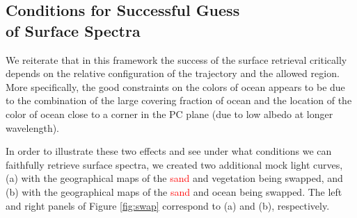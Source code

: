 \documentclass[iop,numberedappendix,apj]{emulateapj}
\def\edit#1{\textcolor{red}{#1}}
\begin{document}
\subsection{Conditions for Successful Guess\\of Surface Spectra}
\label{ss:guess}


We reiterate that in this framework the success of the surface retrieval critically depends on the relative configuration of the trajectory and the allowed region. 
More specifically, the good constraints on the colors of ocean appears to be due to the combination of the large covering fraction of ocean and the location of the color of ocean close to a corner in the PC plane (due to low albedo at longer wavelength). 

In order to illustrate these two effects and see under what conditions we can faithfully retrieve surface spectra, we created two additional mock light curves, (a) with the geographical maps of the \edit{sand} and vegetation being swapped, and  (b) with the geographical maps of the \edit{sand} and ocean being swapped. 
The left and right panels of Figure \ref{fig:swap} correspond to (a) and (b), respectively. 
\end{document}
